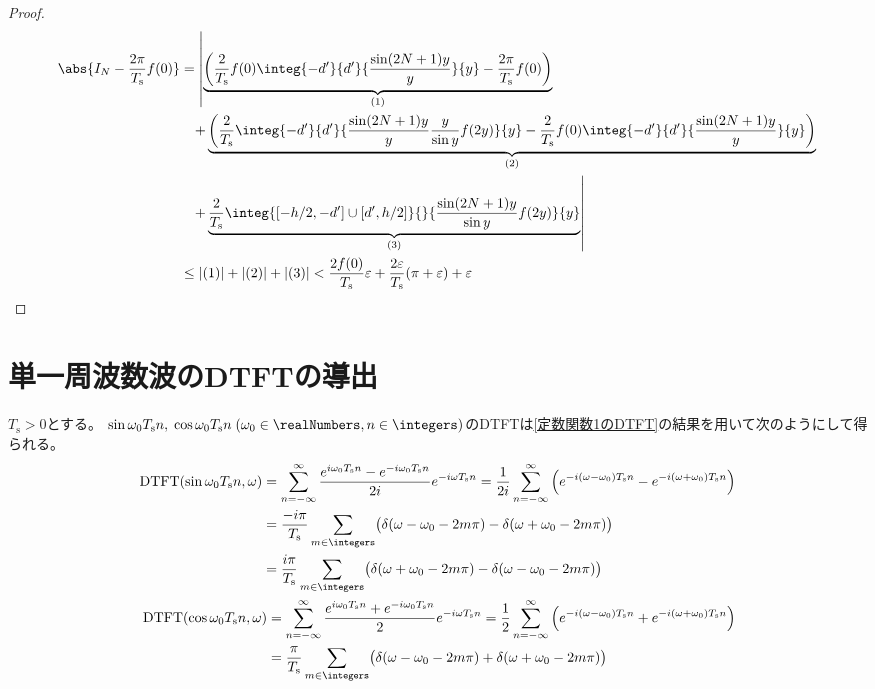\begin{proof}
					\begin{align*}
						\abs{I_N - \frac{2\pi}{T_\text{s}} f(0)} &= \left|\underbrace{\left(\frac{2}{T_\text{s}}f(0)\integ{-d'}{d'}{\frac{\sin(2N+1)y}{y}}{y} - \frac{2\pi}{T_\text{s}} f(0)\right)}_{(1)} \right. \\
						&\phantom{=} \left.+ \underbrace{\left(\frac{2}{T_\text{s}}\integ{-d'}{d'}{\frac{\sin(2N+1)y}{y}\frac{y}{\sin y}f(2y)}{y} - \frac{2}{T_\text{s}}f(0)\integ{-d'}{d'}{\frac{\sin(2N+1)y}{y}}{y}\right)}_{(2)} \right. \\
						&\phantom{=} \left.+ \underbrace{\frac{2}{T_\text{s}}\integ{[-h/2,-d']\cup[d',h/2]}{}{\frac{\sin(2N+1)y}{\sin y}f(2y)}{y}}_{(3)}\right| \\
						&\leq |(1)| + |(2)| + |(3)| < \frac{2f(0)}{T_\text{s}}\varepsilon + \frac{2\varepsilon}{T_\text{s}}(\pi+\varepsilon) + \varepsilon
					\end{align*}
				\end{proof}
			\section{単一周波数波のDTFTの導出}
				$T_\text{s}>0$とする。
				$\sin\omega_0 T_\text{s} n,\;\cos\omega_0 T_\text{s} n\;(\omega_0\in\realNumbers, n\in\integers)$のDTFTは\ref{定数関数1のDTFT}の結果を用いて次のようにして得られる。
				\begin{align*}
					\begin{split}
						\text{DTFT}(\sin\omega_0 T_\text{s} n, \omega) &= \sum_{n=-\infty}^\infty \frac{e^{i\omega_0 T_\text{s} n} - e^{-i\omega_0 T_\text{s} n}}{2i}e^{-i\omega T_\text{s} n} = \frac{1}{2i}\sum_{n=-\infty}^\infty \left(e^{-i(\omega-\omega_0)T_\text{s} n} - e^{-i(\omega+\omega_0)T_\text{s} n}\right) \\
						&= \frac{-i\pi}{T_\text{s}}\sum_{m\in\integers}\bigl(\delta(\omega-\omega_0-2m\pi) - \delta(\omega+\omega_0-2m\pi)\bigr) \\
						&= \frac{i\pi}{T_\text{s}}\sum_{m\in\integers}\bigl(\delta(\omega+\omega_0-2m\pi) - \delta(\omega-\omega_0-2m\pi)\bigr)
					\end{split} \\
					\begin{split}
						\text{DTFT}(\cos\omega_0 T_\text{s} n, \omega) &= \sum_{n=-\infty}^\infty \frac{e^{i\omega_0 T_\text{s} n} + e^{-i\omega_0 T_\text{s} n}}{2}e^{-i\omega T_\text{s} n} = \frac{1}{2}\sum_{n=-\infty}^\infty \left(e^{-i(\omega-\omega_0)T_\text{s} n} + e^{-i(\omega+\omega_0)T_\text{s} n}\right) \\
						&= \frac{\pi}{T_\text{s}}\sum_{m\in\integers}\bigl(\delta(\omega-\omega_0-2m\pi) + \delta(\omega+\omega_0-2m\pi)\bigr)
					\end{split}
				\end{align*}
